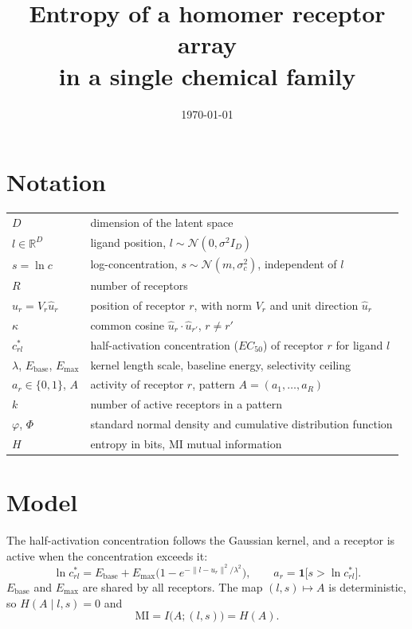 \documentclass[11pt,a4paper]{article}
\title{Entropy of a homomer receptor array\\ in a single chemical family}
\author{}
\date{\today}
\newcommand{\RR}{\mathbb{R}}
\newcommand{\Ebase}{E_{\mathrm{base}}}
\newcommand{\Emax}{E_{\mathrm{max}}}
\newcommand{\uhat}{\hat{u}}
\newcommand{\one}{\mathbf{1}}
\begin{document}
\maketitle

\section*{Notation}

\begin{center}
\begin{tabular}{@{}ll@{}}
\toprule
$D$ & dimension of the latent space\\
$l\in\RR^D$ & ligand position, $l\sim\mathcal N(0,\sigma^2 I_D)$\\
$s=\ln c$ & log-concentration, $s\sim\mathcal N(m,\sigma_c^2)$, independent of $l$\\
$R$ & number of receptors\\
$u_r=V_r\uhat_r$ & position of receptor $r$, with norm $V_r$ and unit direction $\uhat_r$\\
$\kappa$ & common cosine $\uhat_r\cdot\uhat_{r'}$, $r\neq r'$\\
$c^*_{rl}$ & half-activation concentration ($EC_{50}$) of receptor $r$ for ligand $l$\\
$\lambda$, $\Ebase$, $\Emax$ & kernel length scale, baseline energy, selectivity ceiling\\
$a_r\in\{0,1\}$, $A$ & activity of receptor $r$, pattern $A=(a_1,\dots,a_R)$\\
$k$ & number of active receptors in a pattern\\
$\varphi$, $\Phi$ & standard normal density and cumulative distribution function\\
$H$ & entropy in bits, MI mutual information\\
\bottomrule
\end{tabular}
\end{center}

\section{Model}

The half-activation concentration follows the Gaussian kernel, and a receptor is active
when the concentration exceeds it:
\begin{equation}
  \ln c^*_{rl}=\Ebase+\Emax\Big(1-e^{-\|l-u_r\|^2/\lambda^2}\Big),
  \qquad
  a_r=\one\big[s>\ln c^*_{rl}\big].
  \label{eq:model}
\end{equation}
$\Ebase$ and $\Emax$ are shared by all receptors. The map $(l,s)\mapsto A$ is
deterministic, so $H(A\mid l,s)=0$ and
\begin{equation}
  \mathrm{MI}=I\big(A;(l,s)\big)=H(A).
\end{equation}
\end{document}
